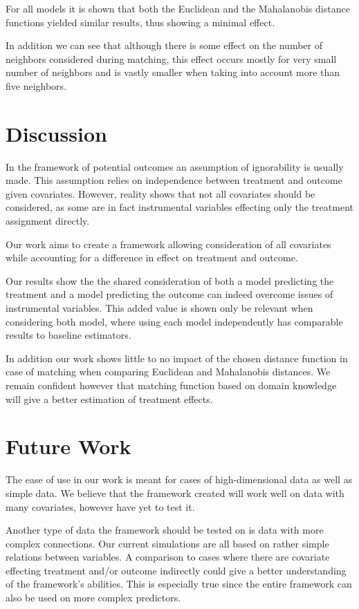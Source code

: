\documentclass{article}
\begin{document}
For all models it is shown that both the Euclidean and the Mahalanobis distance functions yielded similar results, thus showing a minimal effect. 

In addition we can see that although there is some effect on the number of neighbors considered during matching, this effect occurs mostly for very small number of neighbors and is vastly smaller when taking into account more than five neighbors. 

\section{Discussion}
In the framework of potential outcomes an assumption of ignorability is usually made. This assumption relies on independence between treatment and outcome given covariates. However, reality shows that not all covariates should be considered, as some are in fact instrumental variables effecting only the treatment assignment directly. 

Our work aims to create a framework allowing consideration of all covariates while accounting for a difference in effect on treatment and outcome. 

Our results show the the shared consideration of both a model predicting the treatment and a model predicting the outcome can indeed overcome issues of instrumental variables. This added value is shown only be relevant when considering both model, where using each model independently has comparable results to baseline estimators.

In addition our work shows little to no impact of the chosen distance function in case of matching when comparing Euclidean and Mahalanobis distances. We remain confident however that matching function based on domain knowledge will give a better estimation of treatment effects. 

\section{Future Work}
The ease of use in our work is meant for cases of high-dimensional data as well as simple data. We believe that the framework created will work well on data with many covariates, however have yet to test it.

Another type of data the framework should be tested on is data with more complex connections. Our current simulations are all based on rather simple relations between variables. A comparison to cases where there are covariate effecting treatment and/or outcome indirectly could give a better understanding of the framework's abilities. This is especially true since the entire framework can also be used on more complex predictors.
\end{document}
